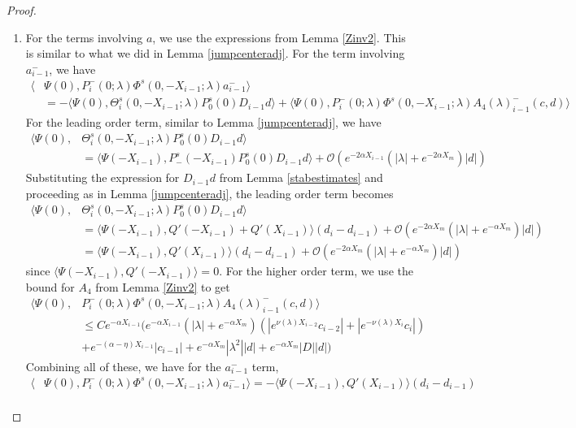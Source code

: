 \documentclass[thesis.tex]{subfiles}
\begin{document}
\begin{lemma}
\begin{proof}
\begin{enumerate}
\item For the terms involving $a$, we use the expressions from Lemma \ref{Zinv2}. This is similar to what we did in Lemma \ref{jumpcenteradj}. For the term involving $a_{i-1}^-$, we have 
\begin{align*}
\langle &\Psi(0), P_i^-(0; \lambda) \Phi^s(0, -X_{i-1}; \lambda) a_{i-1}^- \rangle \\
&= -\langle \Psi(0), \Theta_i^s(0, -X_{i-1}; \lambda) P_0^s(0) D_{i-1} d \rangle + \langle \Psi(0), P_i^-(0; \lambda) \Phi^s(0, -X_{i-1}; \lambda) A_4(\lambda)_{i-1}^-(c, d) \rangle
\end{align*}
For the leading order term, similar to Lemma \ref{jumpcenteradj}, we have
\begin{align*}
\langle \Psi(0), &\Theta_i^s(0, -X_{i-1}; \lambda) P_0^s(0) D_{i-1} d \rangle \\
&= \langle \Psi(-X_{i-1}), P^s_-(-X_{i-1}) P_0^s(0) D_{i-1} d \rangle + \mathcal{O}(e^{-2 \alpha X_{i-1}}(|\lambda| + e^{-2 \alpha X_m})|d|)
\end{align*}
Substituting the expression for $D_{i-1}d$ from Lemma \ref{stabestimates} and proceeding as in Lemma \ref{jumpcenteradj}, the leading order term becomes
\begin{align*}
\langle \Psi(0), &\Theta_i^s(0, -X_{i-1}; \lambda) P_0^s(0) D_{i-1} d \rangle \\
&= \langle \Psi(-X_{i-1}), Q'(-X_{i-1}) + Q'(X_{i-1}) \rangle (d_i - d_{i-1} ) + \mathcal{O}(e^{-2 \alpha X_m}(|\lambda| + e^{-\alpha X_m})|d|) \\
&= \langle \Psi(-X_{i-1}), Q'(X_{i-1}) \rangle (d_i - d_{i-1} ) + \mathcal{O}(e^{-2 \alpha X_m}(|\lambda| + e^{-\alpha X_m})|d|)
\end{align*}
since $\langle \Psi(-X_{i-1}), Q'(-X_{i-1}) \rangle = 0$. For the higher order term, we use the bound for $A_4$ from Lemma \ref{Zinv2} to get
\begin{align*}
\langle \Psi(0), &P_i^-(0; \lambda) \Phi^s(0, -X_{i-1}; \lambda) A_4(\lambda)_{i-1}^-(c, d) \rangle \\
&\leq C e^{-\alpha X_{i-1}} \Big(  
e^{-\alpha X_{i-1}} (|\lambda| + e^{-\alpha X_m})(|e^{\nu(\lambda)X_{i-2}} c_{i-2}| + |e^{-\nu(\lambda)X_i}c_i|) \\
&+ e^{-(\alpha - \eta)X_{i-1}}|c_{i-1}| + e^{-\alpha X_m} |\lambda^2||d| + e^{-\alpha X_m}|D||d| \Big)
\end{align*}
Combining all of these, we have for the $a_{i-1}^-$ term,
\begin{align*}
\langle &\Psi(0), P_i^-(0; \lambda) \Phi^s(0, -X_{i-1}; \lambda) a_{i-1}^- \rangle = -\langle \Psi(-X_{i-1}), Q'(X_{i-1}) \rangle (d_i - d_{i-1} ) \\

\end{align*}
\end{enumerate}
\end{proof}
\end{lemma}
\end{document}
